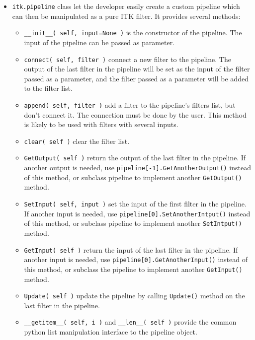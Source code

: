 \documentclass{InsightArticle}
\begin{document}
\begin{itemize}
  \item \verb$itk.pipeline$ class let the developer easily create
a custom pipeline which can then be manipulated as a pure ITK filter.
It provides several methods:
\begin{itemize}
  \item \verb$__init__( self, input=None )$ is the constructor of the pipeline.
The input of the pipeline can be passed as parameter.

  \item \verb$connect( self, filter )$ connect a new filter to the pipeline.
The output of the last filter in the pipeline will be set as the input of the filter
passed as a parameter, and the filter passed as a parameter will be added to the filter
list.

  \item \verb$append( self, filter )$ add a filter to the pipeline's filters list,
but don't connect it. The connection must be done by the user. This method is likely
to be used with filters with several inputs.

  \item \verb$clear( self )$  clear the filter list.

  \item \verb$GetOutput( self )$ return the output of the last filter in the pipeline.
If another output is needed, use \verb$pipeline[-1].GetAnotherOutput()$ instead of
this method, or subclass pipeline to implement another \verb$GetOutput()$ method.

  \item \verb$SetInput( self, input )$ set the input of the first filter in the
pipeline. If another input is needed, use \verb$pipeline[0].SetAnotherIntput()$ instead of
this method, or subclass pipeline to implement another \verb$SetIntput()$ method.

  \item \verb$GetInput( self )$ return the input of the last filter in the pipeline.
If another input is needed, use \verb$pipeline[0].GetAnotherInput()$ instead of
this method, or subclass the pipeline to implement another \verb$GetInput()$ method.

  \item \verb$Update( self )$ update the pipeline by calling \verb$Update()$ method
on the last filter in the pipeline.

  \item \verb$__getitem__( self, i )$ and \verb$__len__( self )$ provide the common
python list manipulation interface to the pipeline object.


\end{itemize}
\end{itemize}
\end{document}
